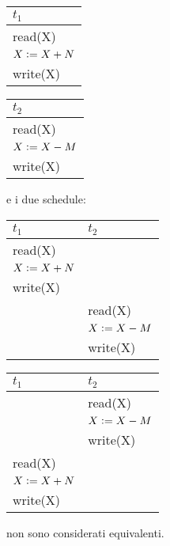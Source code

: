 \begin{multicols}{2}   
 \begin{tabular}{|l|}
     \hline
     $t_1$\\
     \hline
     read(X)\\ 
     $X\vcentcolon=X+N$\\ 
     write(X)\\ 
     \hline
    \end{tabular}



    \begin{tabular}{|l|}
    \hline
     $t_2$\\
     \hline
     read(X)\\ 
     $X\vcentcolon=X-M$\\ 
     write(X)\\
     \hline
    \end{tabular}

  \end{multicols}

  e i due schedule:
\begin{multicols}{2}   
 \begin{tabular}{|l|l|}
 \hline
 $t_1$ & $t_2$\\
 \hline
     read(X) & \\
      $X\vcentcolon=X+N$&\\ 
     write(X)&\\ 
     &read(X)\\ 
     &$X\vcentcolon=X-M$\\ 
     &write(X)\\
     \hline
    \end{tabular}

   \begin{tabular}{|l|l|}
     \hline
     $t_1$ & $t_2$\\
     \hline
     &read(X)\\ 
     &$X\vcentcolon=X-M$\\ 
     &write(X)\\
     read(X) & \\
     $X\vcentcolon=X+N$&\\ 
     write(X)&\\ 
     \hline
    \end{tabular}
  \end{multicols}
  
non sono considerati equivalenti.\\

